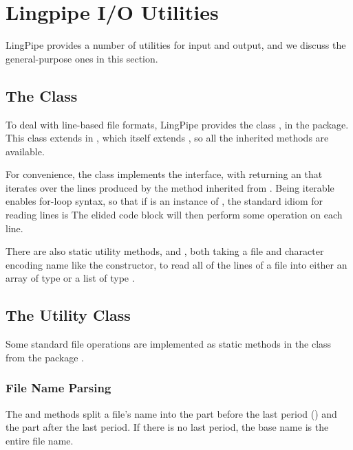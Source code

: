 \section{Lingpipe I/O Utilities}

LingPipe provides a number of utilities for input and output,
and we discuss the general-purpose ones in this section.  

\subsection{The  Class}\label{section:io-file-line-reader}

To deal with line-based file formats, LingPipe provides the class
, in the  package.  This
class extends  in , which itself
extends , so all the inherited methods are
available.  

For convenience, the  class implements the
 interface, with  returning an
 that iterates over the lines produced by the
 method inherited from .  Being
iterable enables for-loop syntax, so that if  is an
instance of , the standard idiom for reading lines is
%
%
The elided code block will then perform some operation on each line.

There are also static utility methods,  and
, both taking a file and character encoding
name like the constructor, to read all of the lines of a file into
either an array of type  or a list of type
.

\subsection{The  Utility Class}

Some standard file operations are implemented as static methods
in the  class from the package .

\subsubsection{File Name Parsing}

The  and  methods split a
file's name into the part before the last period () and the
part after the last period.  If there is no last period, the base name
is the entire file name.

